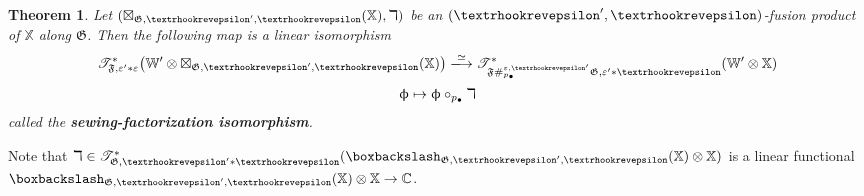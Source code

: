 \documentclass[11pt,b5paper,notitlepage]{article}
\theoremstyle{definition}
\theoremstyle{plain}
\newtheorem{thm}[df]{Theorem}
\newcommand{\blt}{\bullet}
\newcommand{\Xbb}{\mathbb X}
\newcommand{\Wbb}{\mathbb W}
\newcommand{\Cbb}{\mathbb C}
\newcommand{\<}{\left\langle}
\renewcommand{\>}{\right\rangle}
\newcommand{\ST}{\mathscr{T}}
\newcommand{\bbs}{\boxbackslash}
\newcommand{\eps}{\varepsilon}
\newcommand{\ff}{\mathfrak{F}}
\newcommand{\fg}{\mathfrak{G}}
\newcommand{\tipae}{\text{\textrhookrevepsilon}}
\numberwithin{equation}{section}
\begin{document}
\begin{thm}\label{SF}
Let $(\boxtimes_{\fg,\tipae',\tipae}(\Xbb),\daleth)$ be an $(\tipae',\tipae)$-fusion product of $\Xbb$ along $\fg$. Then the following map is a linear isomorphism
\begin{gather}\label{eq19}
\begin{gathered}
\ST_{\ff,\eps'*\eps}^*\big(\Wbb'\otimes \boxtimes_{\fg,\tipae',\tipae}(\Xbb)\big)\xlongrightarrow{\simeq} \ST_{\ff\#^{\eps,\tipae'}_{p_\blt}\fg,\eps'*\tipae}^*(\Wbb'\otimes \Xbb)\\[0.5ex]
\upphi \mapsto \upphi\circ_{p_\blt}\daleth
\end{gathered}
\end{gather}
called the \textbf{sewing-factorization isomorphism}.
\end{thm}

Note that $\daleth\in\ST^*_{\fg,\tipae'*\tipae}(\bbs_{\fg,\tipae',\tipae}(\Xbb)\otimes\Xbb)$ is a linear functional $\bbs_{\fg,\tipae',\tipae}(\Xbb)\otimes\Xbb\rightarrow\Cbb$.
\end{document}

